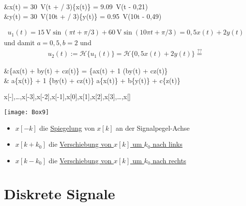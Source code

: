 \begin{abox}
	&\quad x(t) = \SI{30}{\volt}\sin(\pi t + \pi / 3)\quad {}\quad {}\{x(t)\} = \SI{9,09}{\volt}\sin(\pi t - 0,21)\\
	&\quad y(t) = \SI{30}{\volt}\sin(10\pi t + \pi / 3)\quad {}\quad {}\{y(t)\} = \SI{0,95}{\volt}\sin(10\pi t - 0,49)
\end{abox}

\begin{tbox}
	\begin{align*}
	u_1(t) = \SI{15}{\volt}\sin(\pi t + \pi/3) + \SI{60}{\volt}\sin(10\pi t + \pi/3) = 0,5x(t) + 2y(t)
	\end{align*}
	und damit $a = 0,5, b=2$ und
	\begin{align*}
	u_2(t):= \mathcal{H}\{u_1(t)\} = \mathcal{H}\{0,5x(t) + 2y(t)\} \overset{??}{=}
	\end{align*}
\end{tbox}

\begin{abox}
	&\{ax(t) + by(t) + cz(t)\} = \{ax(t) + 1 \cdot (by(t) + cz(t)\}\\
	& a\{x(t)\} + 1 \cdot {}\{by(t) + cz(t)\}  a\{x(t)\} + b\{y(t)\} + c\{z(t)\}
\end{abox}

\begin{abox}
	x[-\infty],\dots,x[-3],x[-2],x[-1],x[0],x[1],x[2],x[3],\dots,x[\infty]
\end{abox}

\begin{tbox}
	\texttt{[image: Box9]}
\end{tbox}

\begin{tbox}
	\begin{itemize}
		\item $x[-k]$ die \underline{Spiegelung} von $x[k]$ an der Signalpegel-Achse
		\item  $x[k + k_0]$ die \underline{Verschiebung von $x[k]$ um $k_0$ nach links}
		\item  $x[k - k_0]$ die \underline{Verschiebung von $x[k]$ um $k_0$ nach rechts}
	\end{itemize}
\end{tbox}

\chapter{Diskrete Signale}
\setcounter{BoxCounter}{10}
\begin{tbox}
\end{tbox}

